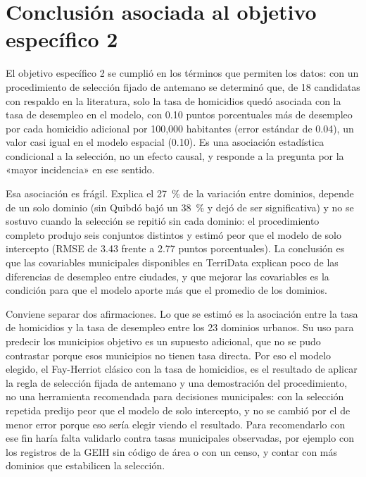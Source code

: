 \section{Conclusión asociada al objetivo específico 2}

El objetivo específico 2 se cumplió en los términos que permiten los datos: con un procedimiento de selección fijado de antemano se determinó que, de 18 candidatas con respaldo en la literatura, solo la tasa de homicidios quedó asociada con la tasa de desempleo en el modelo, con 0.10 puntos porcentuales más de desempleo por cada homicidio adicional por 100,000 habitantes (error estándar de 0.04), un valor casi igual en el modelo espacial (0.10). Es una asociación estadística condicional a la selección, no un efecto causal, y responde a la pregunta por la «mayor incidencia» en ese sentido.

Esa asociación es frágil. Explica el 27~\% de la variación entre dominios, depende de un solo dominio (sin Quibdó bajó un 38~\% y dejó de ser significativa) y no se sostuvo cuando la selección se repitió sin cada dominio: el procedimiento completo produjo seis conjuntos distintos y estimó peor que el modelo de solo intercepto (RMSE de 3.43 frente a 2.77 puntos porcentuales). La conclusión es que las covariables municipales disponibles en TerriData explican poco de las diferencias de desempleo entre ciudades, y que mejorar las covariables es la condición para que el modelo aporte más que el promedio de los dominios.

Conviene separar dos afirmaciones. Lo que se estimó es la asociación entre la tasa de homicidios y la tasa de desempleo entre los 23 dominios urbanos. Su uso para predecir los municipios objetivo es un supuesto adicional, que no se pudo contrastar porque esos municipios no tienen tasa directa. Por eso el modelo elegido, el Fay-Herriot clásico con la tasa de homicidios, es el resultado de aplicar la regla de selección fijada de antemano y una demostración del procedimiento, no una herramienta recomendada para decisiones municipales: con la selección repetida predijo peor que el modelo de solo intercepto, y no se cambió por el de menor error porque eso sería elegir viendo el resultado. Para recomendarlo con ese fin haría falta validarlo contra tasas municipales observadas, por ejemplo con los registros de la GEIH sin código de área o con un censo, y contar con más dominios que estabilicen la selección.

